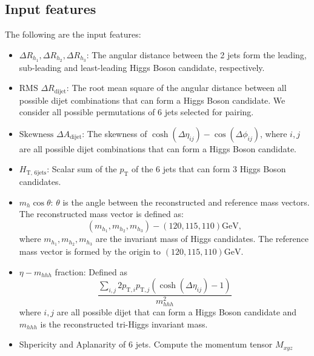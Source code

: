 \documentclass[12pt]{article}
\begin{document}
    \subsection{Input features}%
    \label{sub:input_features}
        The following are the input features:
        \begin{itemize}
            \item $\Delta R_{h_1}, \Delta R_{h_2}, \Delta R_{h_3}$: The angular distance between the 2 jets form the leading, sub-leading and least-leading Higgs Boson candidate, respectively.
            \item $\text{RMS } \Delta R_{\text{dijet}}$: The root mean square of the angular distance between all possible dijet combinations that can form a Higgs Boson candidate. We consider all possible permutations of 6 jets selected for pairing.
            \item $\text{Skewness } \Delta A_{\text{dijet}}$: The skewness of $\cosh\left( \Delta\eta_{ij} \right) - \cos\left( \Delta\phi_{ij} \right) $, where $i,j$ are all possible dijet combinations that can form a Higgs Boson candidate.
            \item $H_{\text{T, 6jets}}$: Scalar sum of the $p_{\text{T}}$ of the 6 jets that can form 3 Higgs Boson candidates.
            \item $m_{h}\cos\theta$: $\theta$ is the angle between the reconstructed and reference mass vectors. The reconstructed mass vector is defined as:
                \begin{equation}
                    \left( m_{h_1}, m_{h_2}, m_{h_3} \right) - \left( 120, 115, 110 \right) \text{GeV},
                \end{equation}
                where $m_{h_1}, m_{h_2}, m_{h_3}$ are the invariant mass of Higgs candidates. The reference mass vector is formed by the origin to $\left( 120, 115, 110 \right) \text{GeV}$.
            \item $\eta - m_{hhh}$ fraction: Defined as
            \begin{equation}
            \frac{\sum_{i,j} 2 p_{\text{T},i} p_{\text{T},j} \left( \cosh\left( \Delta\eta_{ij} \right) -1 \right) }{m_{hhh}^2}
            \end{equation}
            where $i,j$ are all possible dijet that can form a Higgs Boson candidate and $m_{hhh}$ is the reconstructed tri-Higgs invariant mass.
            \item Shpericity and Aplanarity of 6 jets. Compute the momentum tensor $M_{xyz}$ 
               \begin{equation}

\end{equation}
\end{itemize}
\end{document}
